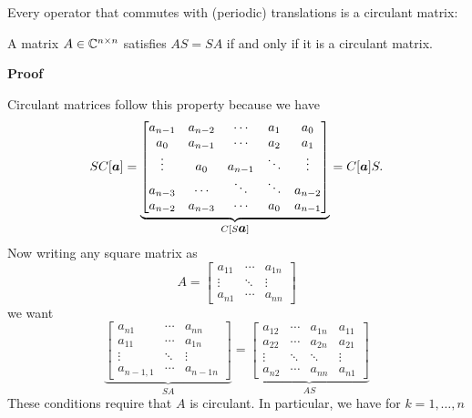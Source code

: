 Every operator that commutes with (periodic) translations is a circulant matrix:

\begin{lemma} A matrix $A \in {\mathbb C}^{n \times n}$ satisfies $A S = S A$ if and only if it is a circulant matrix.

\end{lemma}
\textbf{Proof}

Circulant matrices follow this property because we have
\[
S C[\ensuremath{\bm{\a}}] = \underbrace{\begin{bmatrix}
a_{n-1} & a_{n-2} & \ensuremath{\cdots} & a_1 & a_0 \\
a_0 & a_{n-1} & \ensuremath{\cdots} & a_2 & a_1 \\ 
\ensuremath{\vdots} &  a_0 & a_{n-1} & \ensuremath{\ddots} &  \ensuremath{\vdots}  \\
a_{n-3}  & \ensuremath{\cdots} & \ensuremath{\ddots} & \ensuremath{\ddots} & a_{n-2} \\
a_{n-2} & a_{n-3} & \ensuremath{\cdots} & a_0 & a_{n-1}
\end{bmatrix}}_{C[S \ensuremath{\bm{\a}}]} = C[\ensuremath{\bm{\a}}] S.
\]
Now writing any square matrix as
\[
A = \begin{bmatrix}
a_{11} & \ensuremath{\cdots} & a_{1n} \\
\ensuremath{\vdots} & \ensuremath{\ddots} & \ensuremath{\vdots} \\
a_{n1} & \ensuremath{\cdots} & a_{nn}
\end{bmatrix}
\]
we want
\[
\underbrace{\begin{bmatrix}
a_{n1} & \ensuremath{\cdots} & a_{nn}\\
a_{11} & \ensuremath{\cdots} & a_{1n} \\
\ensuremath{\vdots} & \ensuremath{\ddots} & \ensuremath{\vdots} \\
a_{n-1,1} & \ensuremath{\cdots} & a_{n-1n} 
\end{bmatrix}}_{SA} = \underbrace{\begin{bmatrix}
a_{12} & \ensuremath{\cdots} & a_{1n} & a_{11} \\
a_{22} & \ensuremath{\cdots} & a_{2n} & a_{21} \\
\ensuremath{\vdots} & \ensuremath{\ddots} &  \ensuremath{\ddots} & \ensuremath{\vdots} \\
a_{n2} & \ensuremath{\cdots} & a_{nn} & a_{n1}
\end{bmatrix}}_{AS}
\]
These conditions require that $A$ is circulant. In particular,  we have for $k = 1,\ensuremath{\ldots},n$
